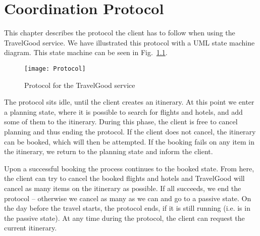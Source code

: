 \chapter{Coordination Protocol}
This chapter describes the protocol the client has to follow when using the TravelGood service. We have illustrated this protocol with a UML state machine diagram. This state machine can be seen in Fig.~\ref{fig:protocol}.

\begin{figure}[H]
\centering
\texttt{[image: Protocol]}
\caption{Protocol for the TravelGood service}
\label{fig:protocol}
\end{figure}

The protocol sits idle, until the client creates an itinerary. At this point we enter a planning state, where it is possible to search for flights and hotels, and add some of them to the itinerary. During this phase, the client is free to cancel planning and thus ending the protocol. If the client does not cancel, the itinerary can be booked, which will then be attempted. If the booking fails on any item in the itinerary, we return to the planning state and inform the client. 

Upon a successful booking the process continues to the booked state. From here, the client can try to cancel the booked flights and hotels and TravelGood will cancel as many items on the itinerary as possible. If all succeeds, we end the protocol -- otherwise we cancel as many as we can and go to a passive state. On the day before the travel starts, the protocol ends, if it is still running (i.e. is in the passive state). At any time during the protocol, the client can request the current itinerary.